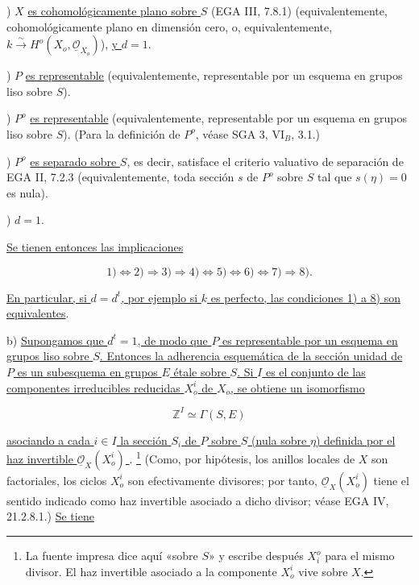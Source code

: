 
\smallskip
{}) $X$ \underline{es cohomológicamente plano sobre $S$} (EGA III,
7.8.1) (equivalentemente, cohomológicamente plano en dimensión cero, o,
equivalentemente,
$k\xrightarrow{\sim}H^o(X_o,\underline{\mathcal O}_{X_o})$),
\underline{y $d=1$}.

\smallskip
{}) $P$ \underline{es representable} (equivalentemente, representable
por un esquema en grupos liso sobre $S$).

\smallskip
{}) $P^o$ \underline{es representable} (equivalentemente, representable
por un esquema en grupos liso sobre $S$). (Para la definición de $P^o$,
véase SGA 3, $\mathrm{VI}_B$, 3.1.)

\smallskip
{}) $P^o$ \underline{es separado sobre $S$}, es decir, satisface el
criterio valuativo de separación de EGA II, 7.2.3 (equivalentemente,
toda sección $s$ de $P^o$ sobre $S$ tal que $s(\eta)=0$ es nula).

\smallskip
{}) $d=1$.

\smallskip
\noindent
\underline{Se tienen entonces las implicaciones}

\begin{equation}\tag{12.1.4}
 1)\Longleftrightarrow2)\Longrightarrow3)\Longrightarrow4)
 \Longleftrightarrow5)\Longleftrightarrow6)\Longleftrightarrow7)
 \Longrightarrow8).
\end{equation}

\noindent
\underline{En particular, si $d=d^t$, por ejemplo si $k$ es perfecto,
las condiciones 1) a 8) son equivalentes}.

\medskip
\noindent
b) \underline{Supongamos que $d^t=1$, de modo que $P$ es representable
por un esquema en grupos liso sobre $S$. Entonces la adherencia
esquemática de la sección unidad de $P$ es un subesquema en grupos $E$
étale sobre $S$. Si $I$ es el conjunto de las componentes irreducibles
reducidas $X_o^i$ de $X_o$, se obtiene un isomorfismo}

\begin{equation}\tag{12.1.5}
 \mathbb Z^I\simeq\Gamma(S,E)
\end{equation}


\noindent
\underline{asociando a cada $i\in I$ la sección $S_i$ de $P$ sobre $S$
(nula sobre $\eta$) definida por el haz invertible
$\underline{\mathcal O}_X(X_o^i)$ }.
\footnote{La fuente impresa dice aquí «sobre $S$» y escribe después
$X_i^o$ para el mismo divisor. El haz invertible asociado a la componente
$X_o^i$ vive sobre $X$.}
(Como, por hipótesis, los anillos locales de $X$ son factoriales, los
ciclos $X_o^i$ son efectivamente divisores; por tanto,
$\underline{\mathcal O}_X(X_o^i)$ tiene el sentido indicado como haz
invertible asociado a dicho divisor; véase EGA IV, 21.2.8.1.)
\underline{Se tiene}

